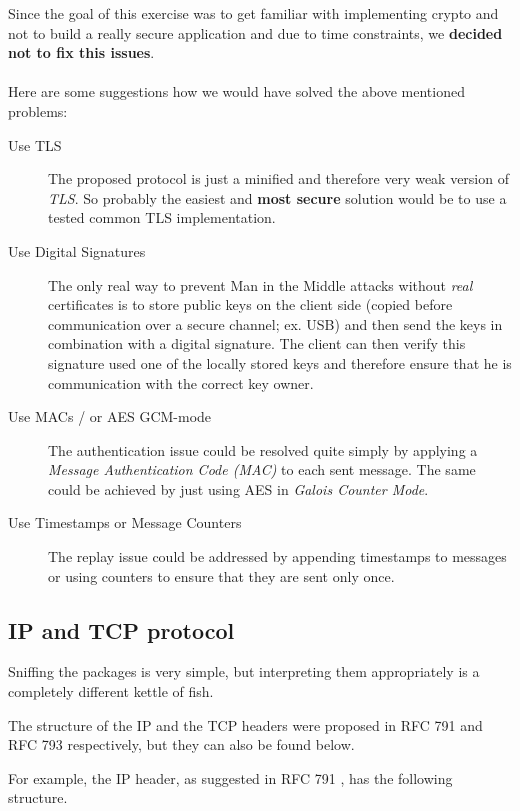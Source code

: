 \documentclass[11pt, a4paper]{article}
\begin{document}
Since the goal of this exercise was to get familiar with implementing crypto
and not to build a really secure application and due to time constraints, we
\textbf{decided not to fix this issues}.
\\\\
Here are some suggestions how we would have solved the above mentioned problems:

\begin{description}
	
	\item[Use TLS] The proposed protocol is just a minified and therefore very
	weak version of \textit{TLS}. So probably the easiest and \textbf{most
		secure} solution would be to use a tested common TLS implementation.
	
	\item[Use Digital Signatures] The only real way to prevent Man in the Middle
	attacks without \textit{real} certificates is to store public keys on the
	client side (copied before communication over a secure channel; ex. USB) and
	then send the keys in combination with a digital signature. The client can
	then verify this signature used one of the locally stored keys and therefore
	ensure that he is communication with the correct key owner.
	
	\item[Use MACs / or AES GCM-mode] The authentication issue could be resolved
	quite simply by applying a \textit{Message Authentication Code (MAC)} to
	each sent message. The same could be achieved by just using AES in
	\textit{Galois Counter Mode}.
	
	\item[Use Timestamps or Message Counters] The replay issue could be
	addressed by appending timestamps to messages or using counters to ensure
	that they are sent only once.
	
\end{description}

\subsection{IP and TCP protocol}
\label{subsec:iptcp}
Sniffing the packages is very simple, but interpreting them
appropriately is a completely different kettle of fish. 

The structure of the IP and the TCP headers were proposed in RFC 791
and RFC 793 respectively, but they can also be found below. 

For example, the IP header, as suggested in RFC 791 \cite{rfc791}, has
the following structure. 
\end{document}
